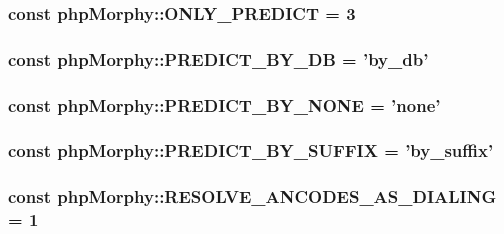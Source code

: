 \label{classphpMorphy_a8cfde1e320c3114a46b5a250cfa2c368}
\hypertarget{classphpMorphy_a2ab6f41bcb2c2bb31dd1f7f92f1b38ee}{
\subsubsection[{ONLY\_\-PREDICT}]{\setlength{\rightskip}{0pt plus 5cm}const {\bf phpMorphy::ONLY\_\-PREDICT} = 3}}
\label{classphpMorphy_a2ab6f41bcb2c2bb31dd1f7f92f1b38ee}
\hypertarget{classphpMorphy_ada1e5f1e0eb2de867e273e23a4022955}{
\subsubsection[{PREDICT\_\-BY\_\-DB}]{\setlength{\rightskip}{0pt plus 5cm}const {\bf phpMorphy::PREDICT\_\-BY\_\-DB} = 'by\_\-db'}}
\label{classphpMorphy_ada1e5f1e0eb2de867e273e23a4022955}
\hypertarget{classphpMorphy_a9359de1c31adfc1c10894cbead48e2ba}{
\subsubsection[{PREDICT\_\-BY\_\-NONE}]{\setlength{\rightskip}{0pt plus 5cm}const {\bf phpMorphy::PREDICT\_\-BY\_\-NONE} = 'none'}}
\label{classphpMorphy_a9359de1c31adfc1c10894cbead48e2ba}
\hypertarget{classphpMorphy_a1c02f9420ccc29ac4e2f80bf3688994d}{
\subsubsection[{PREDICT\_\-BY\_\-SUFFIX}]{\setlength{\rightskip}{0pt plus 5cm}const {\bf phpMorphy::PREDICT\_\-BY\_\-SUFFIX} = 'by\_\-suffix'}}
\label{classphpMorphy_a1c02f9420ccc29ac4e2f80bf3688994d}
\hypertarget{classphpMorphy_a9cfb01a8a056c9322e3bb3680a8b921c}{
\subsubsection[{RESOLVE\_\-ANCODES\_\-AS\_\-DIALING}]{\setlength{\rightskip}{0pt plus 5cm}const {\bf phpMorphy::RESOLVE\_\-ANCODES\_\-AS\_\-DIALING} = 1}}
